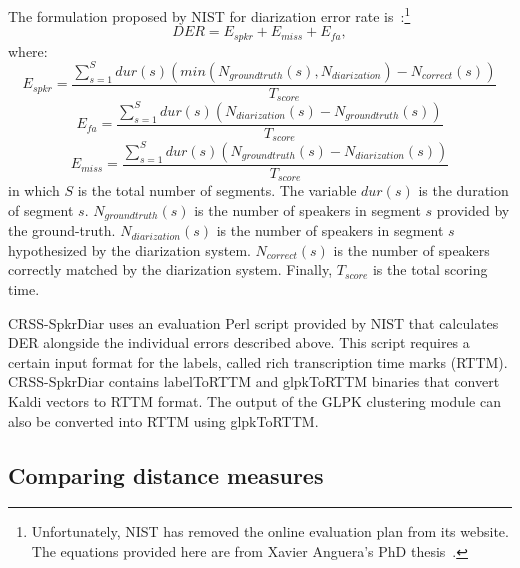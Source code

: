 The formulation proposed by NIST for diarization error rate is~\cite{anguera2012DRZreview}:\footnote{Unfortunately, NIST has removed the online evaluation plan from its website. The equations provided here are from Xavier Anguera's PhD thesis~\cite{anguera2007phd}.}
\begin{equation}
DER = E_{spkr} + E_{miss} + E_{fa}, 
\end{equation}
where: 
\begin{equation}
E_{spkr} = \frac{\sum\limits_{s=1}^{S} dur(s)(min(N_{groundtruth}(s),N_{diarization})-N_{correct}(s))}{T_{score}}
\end{equation}
\begin{equation}
E_{fa} = \frac{\sum\limits_{s=1}^S dur(s)(N_{diarization}(s)-N_{groundtruth}(s))}{T_{score}}
\end{equation}
\begin{equation}
E_{miss} = \frac{\sum\limits_{s=1}^S dur(s)(N_{groundtruth}(s) - N_{diarization}(s))}{T_{score}}
\end{equation}
in which $S$ is the total number of segments. The variable $dur(s)$ is the duration of segment $s$. $N_{groundtruth}(s)$ is the number of speakers in segment $s$ provided by the ground-truth. 
$N_{diarization}(s)$ is the number of speakers in segment $s$ hypothesized by the diarization system. 
$N_{correct}(s)$ is the number of speakers correctly matched by the diarization system. 
Finally, $T_{score}$ is the total scoring time. 

CRSS-SpkrDiar uses an evaluation Perl script provided by NIST that calculates DER alongside the individual errors described above. 
This script requires a certain input format for the labels, called rich transcription time marks (RTTM). 
CRSS-SpkrDiar contains labelToRTTM and glpkToRTTM binaries that convert Kaldi vectors to RTTM format. 
The output of the GLPK clustering module can also be converted into RTTM using glpkToRTTM. 

\subsection{Comparing distance measures}

